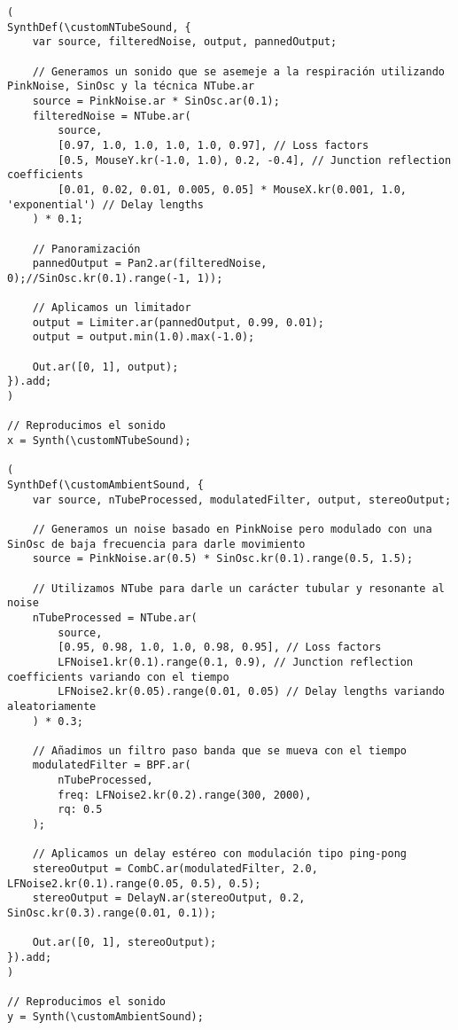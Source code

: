 \begin{minipage}[t]{1\textwidth}
    \centering
    \begin{lstlisting}[style=SuperCollider-IDE, basicstyle=\footnotesize\ttfamily, numbers=none]
(
SynthDef(\customNTubeSound, {
    var source, filteredNoise, output, pannedOutput;

    // Generamos un sonido que se asemeje a la respiración utilizando PinkNoise, SinOsc y la técnica NTube.ar
    source = PinkNoise.ar * SinOsc.ar(0.1);
    filteredNoise = NTube.ar(
        source,
        [0.97, 1.0, 1.0, 1.0, 1.0, 0.97], // Loss factors
        [0.5, MouseY.kr(-1.0, 1.0), 0.2, -0.4], // Junction reflection coefficients
        [0.01, 0.02, 0.01, 0.005, 0.05] * MouseX.kr(0.001, 1.0, 'exponential') // Delay lengths
    ) * 0.1;

    // Panoramización
    pannedOutput = Pan2.ar(filteredNoise, 0);//SinOsc.kr(0.1).range(-1, 1));

    // Aplicamos un limitador
    output = Limiter.ar(pannedOutput, 0.99, 0.01);
    output = output.min(1.0).max(-1.0);

    Out.ar([0, 1], output);
}).add;
)

// Reproducimos el sonido
x = Synth(\customNTubeSound);

(
SynthDef(\customAmbientSound, {
    var source, nTubeProcessed, modulatedFilter, output, stereoOutput;

    // Generamos un noise basado en PinkNoise pero modulado con una SinOsc de baja frecuencia para darle movimiento
    source = PinkNoise.ar(0.5) * SinOsc.kr(0.1).range(0.5, 1.5);

    // Utilizamos NTube para darle un carácter tubular y resonante al noise
    nTubeProcessed = NTube.ar(
        source,
        [0.95, 0.98, 1.0, 1.0, 0.98, 0.95], // Loss factors
        LFNoise1.kr(0.1).range(0.1, 0.9), // Junction reflection coefficients variando con el tiempo
        LFNoise2.kr(0.05).range(0.01, 0.05) // Delay lengths variando aleatoriamente
    ) * 0.3;

    // Añadimos un filtro paso banda que se mueva con el tiempo
    modulatedFilter = BPF.ar(
        nTubeProcessed,
        freq: LFNoise2.kr(0.2).range(300, 2000),
        rq: 0.5
    );

    // Aplicamos un delay estéreo con modulación tipo ping-pong
    stereoOutput = CombC.ar(modulatedFilter, 2.0, LFNoise2.kr(0.1).range(0.05, 0.5), 0.5);
    stereoOutput = DelayN.ar(stereoOutput, 0.2, SinOsc.kr(0.3).range(0.01, 0.1));

    Out.ar([0, 1], stereoOutput);
}).add;
)

// Reproducimos el sonido
y = Synth(\customAmbientSound);                
    \end{lstlisting}
    \vspace{1cm}
\end{minipage}





